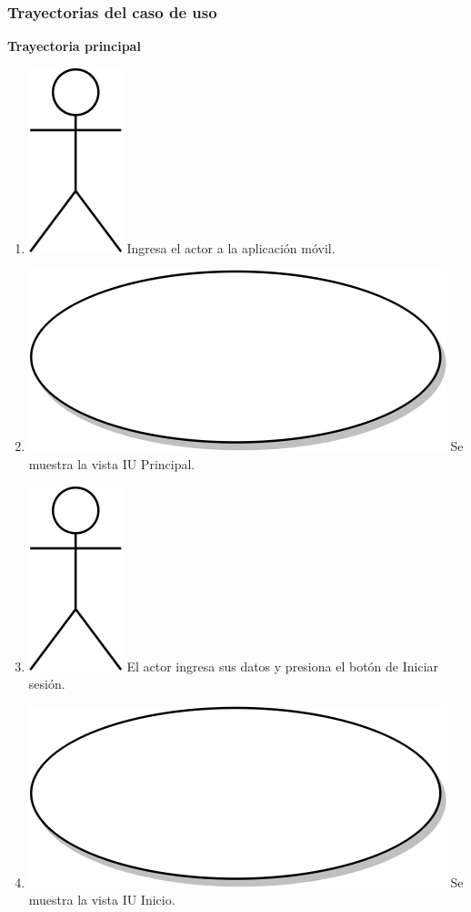 \subsubsection{Trayectorias del caso de uso}
\textbf{Trayectoria principal}
\begin{enumerate}
 \item {\includegraphics[scale=.1]{Capitulo3/img/actor.png} Ingresa el actor a la aplicación móvil.}
\item {\includegraphics[scale=.05]{Capitulo3/img/proceso.png} Se muestra la vista IU Principal.}
\item {\includegraphics[scale=.1]{Capitulo3/img/actor.png} El actor ingresa sus datos y presiona el botón de Iniciar sesión.}
\item {\includegraphics[scale=.05]{Capitulo3/img/proceso.png} Se muestra la vista IU Inicio.}

\end{enumerate}
